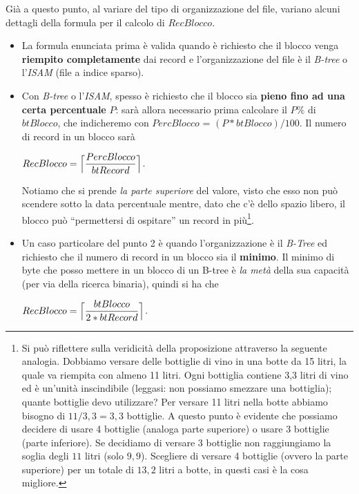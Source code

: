  Già a questo punto, al variare del tipo di organizzazione del file, variano alcuni dettagli della formula per il calcolo di
 $RecBlocco$.
 \begin{itemize}
  \item La formula enunciata prima è valida quando è richiesto che il blocco venga \textbf{riempito completamente} dai record e 
 l'organizzazione del file è il \emph{B-tree} o l'\emph{ISAM} (file a indice sparso).
  \item Con \emph{B-tree} o l'\emph{ISAM}, spesso è richiesto che il blocco sia \textbf{pieno fino ad una certa percentuale} $P$:
  sarà allora necessario prima calcolare il $P\%$ di $btBlocco$, che indicheremo con $PercBlocco$ = $(P * btBlocco)/100$. Il numero
  di record in un blocco sarà
  \begin{center}
  $RecBlocco = \Bigl\lceil \dfrac{PercBlocco}{btRecord} \Bigr\rceil$.
  \end{center}
  Notiamo che si prende \emph{la parte superiore} del valore, visto che esso non può scendere sotto la data percentuale mentre, 
   dato che c'è dello spazio libero, il blocco può ``permettersi di ospitare'' un record in più\footnote{Si può riflettere sulla
  veridicità della proposizione attraverso la seguente analogia.
  Dobbiamo versare delle bottiglie di vino in una botte da 15 litri, la quale va riempita con almeno 11 litri. 
  Ogni bottiglia contiene 3,3 litri di vino ed è un'unità inscindibile (leggasi: non possiamo smezzare una bottiglia); quante bottiglie
  devo utilizzare? Per versare 11 litri nella botte abbiamo bisogno di $11/3,3=3,3$ bottiglie. A questo punto è evidente che 
  possiamo decidere di usare 4 bottiglie (analoga parte superiore) o usare 3 bottiglie (parte inferiore). Se decidiamo di versare 
  3 bottiglie non raggiungiamo la soglia degli $11$ litri (solo $9,9$). Scegliere di versare 4 bottiglie (ovvero 
  la parte superiore) per un totale di $13,2$ litri a botte, in questi casi è la cosa migliore.}.  
  \item Un caso particolare del punto 2 è quando l'organizzazione è il \emph{B-Tree} ed richiesto che il numero di record in un blocco
  sia il \textbf{minimo}. Il minimo di byte che posso mettere in un blocco di un B-tree è \emph{la metà} della sua capacità
  (per via della ricerca binaria), quindi si ha che
   \begin{center}
  $RecBlocco = \Bigl\lceil \dfrac{btBlocco}{2*btRecord} \Bigr\rceil$.\\
  \end{center}
 \end{itemize}
 
